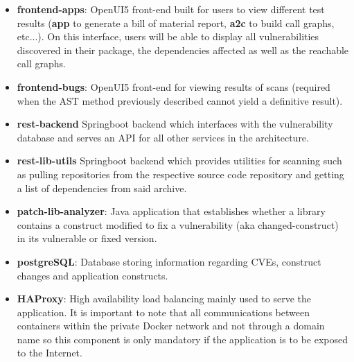 \documentclass[11pt]{article}
\begin{document}
\begin{itemize}
\renewcommand\labelitemi{--}
    \item \textbf{frontend-apps}: \newline
    OpenUI5 front-end built for users to view different test results (\textbf{app} to generate a bill of material report, \textbf{a2c} to build call graphs, etc...). On this interface, users will be able to display all vulnerabilities discovered in their package, the dependencies affected as well as the reachable call graphs\autocite{Frontendapps}.

    \item \textbf{frontend-bugs}: \newline 
    OpenUI5 front-end for viewing results of scans (required when the AST method  previously described cannot yield a definitive result).
    
    \item \textbf{rest-backend} \newline 
    Springboot backend which interfaces with the vulnerability database and serves an API for all other services in the architecture.
    
    \item \textbf{rest-lib-utils} \newline
    Springboot backend which provides utilities for scanning such as pulling repositories from the respective source code repository and getting a list of dependencies from said archive.
    
    \item \textbf{patch-lib-analyzer}: \newline 
    Java application that establishes whether a library contains a construct modified to fix a vulnerability (aka changed-construct) in its vulnerable or fixed version. 
    
    \item \textbf{postgreSQL}: \newline Database storing information regarding CVEs, construct changes and application constructs.
    
    \item \textbf{HAProxy}: \newline High availability load balancing mainly used to serve the application. It is important to note that all communications between containers within the private Docker network and not through a domain name so this component is only mandatory if the application is to be exposed to the Internet.
\end{itemize}
\end{document}
